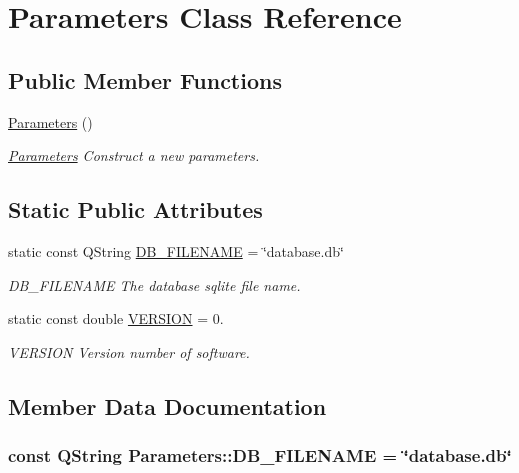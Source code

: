 \hypertarget{classParameters}{\section{Parameters Class Reference}
\label{classParameters}
}
\subsection*{Public Member Functions}
\begin{DoxyCompactItemize}
\item 
\hypertarget{classParameters_af4d94ee360ac0157d9065f78797fe9a1}{\hyperlink{classParameters_af4d94ee360ac0157d9065f78797fe9a1}{Parameters} ()}\label{classParameters_af4d94ee360ac0157d9065f78797fe9a1}

\begin{DoxyCompactList}\small\item\em \hyperlink{classParameters}{Parameters} Construct a new parameters. \end{DoxyCompactList}\end{DoxyCompactItemize}
\subsection*{Static Public Attributes}
\begin{DoxyCompactItemize}
\item 
static const Q\+String \hyperlink{classParameters_a80b98bd51d910bcc2203afcacbc7df87}{D\+B\+\_\+\+F\+I\+L\+E\+N\+A\+M\+E} = \char`\"{}database.\+db\char`\"{}
\begin{DoxyCompactList}\small\item\em D\+B\+\_\+\+F\+I\+L\+E\+N\+A\+M\+E The database sqlite file name. \end{DoxyCompactList}\item 
static const double \hyperlink{classParameters_a279ee24140c761de46178daa8960bdc8}{V\+E\+R\+S\+I\+O\+N} = 0.
\begin{DoxyCompactList}\small\item\em V\+E\+R\+S\+I\+O\+N Version number of software. \end{DoxyCompactList}\end{DoxyCompactItemize}


\subsection{Member Data Documentation}
\hypertarget{classParameters_a80b98bd51d910bcc2203afcacbc7df87}{
\subsubsection[{D\+B\+\_\+\+F\+I\+L\+E\+N\+A\+M\+E}]{\setlength{\rightskip}{0pt plus 5cm}const Q\+String Parameters\+::\+D\+B\+\_\+\+F\+I\+L\+E\+N\+A\+M\+E = \char`\"{}database.\+db\char`\"{}\hspace{0.3cm}{\ttfamily [static]}}}\label{classParameters_a80b98bd51d910bcc2203afcacbc7df87}


